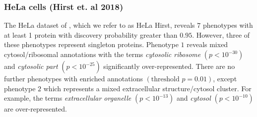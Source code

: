 \documentclass[12pt,english]{article}
\begin{document}
\subsubsection{HeLa cells (Hirst et. al 2018)}
The HeLa dataset of \cite{Hirst:2018}, which we refer to as HeLa Hirst, reveals $7$ phenotypes with at least 1 protein with discovery probability greater than $0.95$. However, three of these phenotypes represent singleton proteins. Phenotype $1$ reveals mixed cytosol/ribosomal annotations with the terms \textit{cytosolic ribosome} $(p < 10^{-30})$ and \textit{cytosolic part} $(p < 10^{-25})$ significantly over-represented. There are no further phenotypes with enriched annotations $(\text{threshold } p = 0.01)$, except phenotype $2$ which represents a mixed extracellular structure/cytosol cluster. For example, the terms \textit{extracellular organelle} $(p <10^{-13})$ and \textit{cytosol} $(p < 10^{-10})$ are over-represented.
\end{document}

